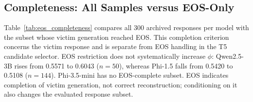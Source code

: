 \documentclass[electronics,article,submit,pdftex,moreauthors]{Definitions/mdpi}
\begin{document}
\subsection{Completeness: All Samples versus EOS-Only}
Table~\ref{tab:eos_completeness} compares all 300 archived responses per model with the subset whose victim generation reached EOS. This completion criterion concerns the victim response and is separate from EOS handling in the T5 candidate selector. EOS restriction does not systematically increase $\phi$: Qwen2.5-3B rises from 0.5571 to 0.6043 ($n=50$), whereas Phi-1.5 falls from 0.5420 to 0.5108 ($n=144$). Phi-3.5-mini has no EOS-complete subset. EOS indicates completion of victim generation, not correct reconstruction; conditioning on it also changes the evaluated response subset.

\begin{table}[ht]
\centering
\caption{EOS subsets of the archived-reference cohort ($N=300$ per model; validated length inputs, all segments, 80-token T5 input and output limits). EOS-only metrics select \texttt{response\_complete} samples; they do not certify correct reconstructions. Both LR columns report percentages. Phi-3.5-mini and TinyLlama remain reference-format diagnostics.}
\label{tab:eos_completeness}
\end{table}
\end{document}

